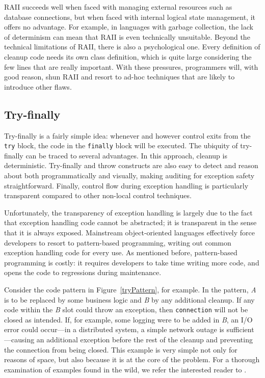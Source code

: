 \documentclass[11pt]{article}
\newcommand{\maybePage}{\newpage}
\begin{document}
RAII succeeds well when faced with managing external resources such as database connections, but when faced with internal logical state management, it offers no advantage.
For example, in languages with garbage collection, the lack of determinism can mean that RAII is even technically unsuitable.
Beyond the technical limitations of RAII, there is also a psychological one.
Every definition of cleanup code needs its own class definition, which is quite large considering the few lines that are really important.
With these pressures, programmers will, with good reason, shun RAII and resort to ad-hoc techniques that are likely to introduce other flaws.


\maybePage
\subsection{Try-finally}
\label{try-finally}

Try-finally is a fairly simple idea: whenever and however control exits from the \texttt{try} block, the code in the \texttt{finally} block will be executed.
The ubiquity of try-finally can be traced to several advantages.
In this approach, cleanup is deterministic.
Try-finally and throw constructs are also easy to detect and reason about both programmatically and visually, making auditing for exception safety straightforward.
Finally, control flow during exception handling is particularly transparent compared to other non-local control techniques.

Unfortunately, the transparency of exception handling is largely due to the fact that exception handling code cannot be abstracted;
it is transparent in the sense that it is always exposed.
Mainstream object-oriented languages effectively force developers to resort to pattern-based programming, writing out common exception handling code for every use.
As mentioned before, pattern-based programming is costly: it requires developers to take time writing more code, and opens the code to regressions during maintenance.

Consider the code pattern in Figure~\ref{tryPattern}, for example.
In the pattern, \textit{A} is to be replaced by some business logic and \textit{B} by any additional cleanup.
If any code within the \textit{B} slot could throw an exception, then \texttt{connection} will not be closed as intended.
If, for example, some logging were to be added in \textit{B}, an I/O error could occur---in a distributed system, a simple network outage is sufficient---causing an additional exception before the rest of the cleanup and preventing the connection from being closed.
This example is very simple not only for reasons of space, but also because it is at the core of the problem.
For a thorough examination of examples found in the wild, we refer the interested reader to \cite{WeimerNecula08}.
\end{document}
